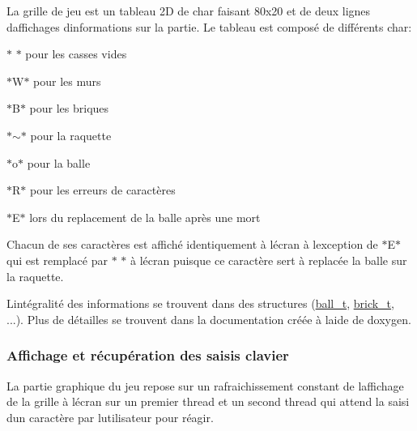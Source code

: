 La grille de jeu est un tableau 2D de char faisant 80x20 et de deux lignes d\textquotesingle{}affichages d\textquotesingle{}informations sur la partie. Le tableau est composé de différents char\+:
\begin{DoxyItemize}
\item $\ast$\textquotesingle{} \textquotesingle{}$\ast$ pour les casses vides
\item $\ast$\textquotesingle{}W\textquotesingle{}$\ast$ pour les murs
\item $\ast$\textquotesingle{}B\textquotesingle{}$\ast$ pour les briques
\item $\ast$\textquotesingle{}$\sim$\textquotesingle{}$\ast$ pour la raquette
\item $\ast$\textquotesingle{}o\textquotesingle{}$\ast$ pour la balle
\item $\ast$\textquotesingle{}R\textquotesingle{}$\ast$ pour les erreurs de caractères
\item $\ast$\textquotesingle{}E\textquotesingle{}$\ast$ lors du replacement de la balle après une mort
\end{DoxyItemize}

Chacun de ses caractères est affiché identiquement à l\textquotesingle{}écran à l\textquotesingle{}exception de $\ast$\textquotesingle{}E\textquotesingle{}$\ast$ qui est remplacé par $\ast$\textquotesingle{} \textquotesingle{}$\ast$ à l\textquotesingle{}écran puisque ce caractère sert à replacée la balle sur la raquette.

L\textquotesingle{}intégralité des informations se trouvent dans des structures (\hyperlink{structball__t}{ball\+\_\+t}, \hyperlink{structbrick__t}{brick\+\_\+t}, ...). Plus de détailles se trouvent dans la documentation créée à l\textquotesingle{}aide de doxygen.

\subsubsection*{Affichage et récupération des saisis clavier}

La partie graphique du jeu repose sur un rafraichissement constant de l\textquotesingle{}affichage de la grille à l\textquotesingle{}écran sur un premier thread et un second thread qui attend la saisi d\textquotesingle{}un caractère par l\textquotesingle{}utilisateur pour réagir.

